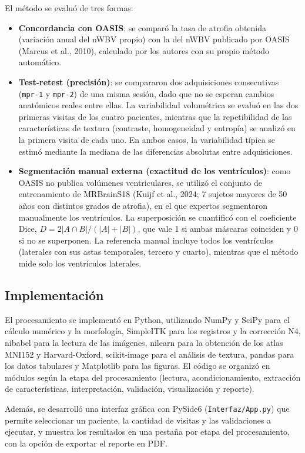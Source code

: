 \documentclass[10pt]{article}
\begin{document}
El método se evaluó de tres formas:
\begin{itemize}
    \item \textbf{Concordancia con OASIS}: se comparó la tasa de atrofia obtenida (variación anual del nWBV propio) con la del nWBV publicado por OASIS (Marcus et al., 2010), calculado por los autores con su propio método automático. 
    \item \textbf{Test-retest (precisión)}: se compararon dos adquisiciones consecutivas (\texttt{mpr-1} y \texttt{mpr-2}) de una misma sesión, dado que no se esperan cambios anatómicos reales entre ellas. La variabilidad volumétrica se evaluó en las dos primeras visitas de los cuatro pacientes, mientras que la repetibilidad de las características de textura (contraste, homogeneidad y entropía) se analizó en la primera visita de cada uno. En ambos casos, la variabilidad típica se estimó mediante la mediana de las diferencias absolutas entre adquisiciones.
    \item \textbf{Segmentación manual externa (exactitud de los ventrículos)}: como OASIS no publica volúmenes ventriculares, se utilizó el conjunto de entrenamiento de MRBrainS18 (Kuijf et al., 2024; 7 sujetos mayores de 50 años con distintos grados de atrofia), en el que expertos segmentaron manualmente los ventrículos. La superposición se cuantificó con el coeficiente Dice, $D = 2|A \cap B| / (|A| + |B|)$, que vale 1 si ambas máscaras coinciden y 0 si no se superponen. La referencia manual incluye todos los ventrículos (laterales con sus astas temporales, tercero y cuarto), mientras que el método mide solo los ventrículos laterales.
\end{itemize}

\subsection{Implementación}
 
El procesamiento se implementó en Python, utilizando NumPy y SciPy para el cálculo numérico y la morfología, SimpleITK para los registros y la corrección N4, nibabel para la lectura de las imágenes, nilearn para la obtención de los atlas MNI152 y Harvard-Oxford, scikit-image para el análisis de textura, pandas para los datos tabulares y Matplotlib para las figuras. El código se organizó en módulos según la etapa del procesamiento (lectura, acondicionamiento, extracción de características, interpretación, validación, visualización y reporte).

Además, se desarrolló una interfaz gráfica con PySide6 (\texttt{Interfaz/App.py}) que permite seleccionar un paciente, la cantidad de visitas y las validaciones a ejecutar, y muestra los resultados en una pestaña por etapa del procesamiento, con la opción de exportar el reporte en PDF.
\end{document}
